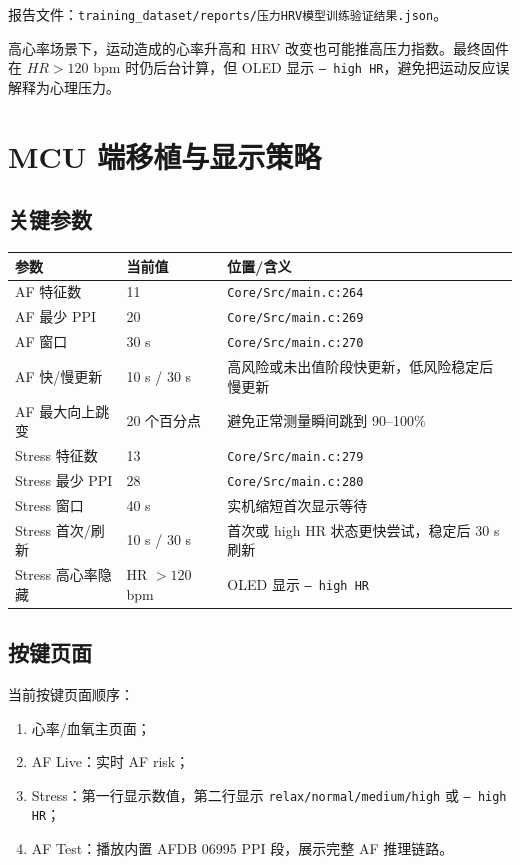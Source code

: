 \documentclass[10.5pt,a4paper,UTF8]{ctexart}
\begin{document}
报告文件：\texttt{training\_dataset/reports/压力HRV模型训练验证结果.json}。

高心率场景下，运动造成的心率升高和 HRV 改变也可能推高压力指数。最终固件在 \(HR>120\) bpm 时仍后台计算，但 OLED 显示 \texttt{-- high HR}，避免把运动反应误解释为心理压力。

\section{MCU 端移植与显示策略}

\subsection{关键参数}

\begin{longtable}{@{}L{4.8cm}L{2.8cm}L{6.4cm}@{}}
\toprule
参数 & 当前值 & 位置/含义 \\
\midrule
AF 特征数 & 11 & \texttt{Core/Src/main.c:264} \\
AF 最少 PPI & 20 & \texttt{Core/Src/main.c:269} \\
AF 窗口 & 30 s & \texttt{Core/Src/main.c:270} \\
AF 快/慢更新 & 10 s / 30 s & 高风险或未出值阶段快更新，低风险稳定后慢更新 \\
AF 最大向上跳变 & 20 个百分点 & 避免正常测量瞬间跳到 90--100\% \\
Stress 特征数 & 13 & \texttt{Core/Src/main.c:279} \\
Stress 最少 PPI & 28 & \texttt{Core/Src/main.c:280} \\
Stress 窗口 & 40 s & 实机缩短首次显示等待 \\
Stress 首次/刷新 & 10 s / 30 s & 首次或 high HR 状态更快尝试，稳定后 30 s 刷新 \\
Stress 高心率隐藏 & HR \(>120\) bpm & OLED 显示 \texttt{-- high HR} \\
\bottomrule
\end{longtable}

\subsection{按键页面}

当前按键页面顺序：

\begin{enumerate}
  \item 心率/血氧主页面；
  \item AF Live：实时 AF risk；
  \item Stress：第一行显示数值，第二行显示 \texttt{relax/normal/medium/high} 或 \texttt{-- high HR}；
  \item AF Test：播放内置 AFDB 06995 PPI 段，展示完整 AF 推理链路。
\end{enumerate}
\end{document}

